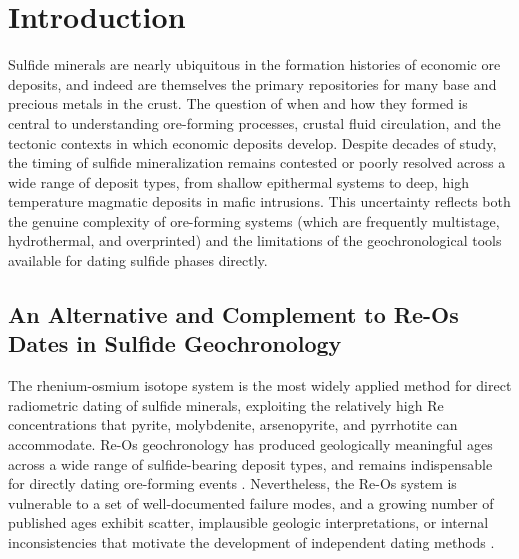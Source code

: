 %

\section{Introduction}\label{sec:ch3-introduction}

Sulfide minerals are nearly ubiquitous in the formation histories of economic ore deposits, 
and indeed are themselves the primary repositories for many base and precious
metals in the crust. The question of when and how they formed is
central to understanding ore-forming processes, crustal fluid
circulation, and the tectonic contexts in which economic deposits
develop. Despite decades of study, the timing of sulfide mineralization
remains contested or poorly resolved across a wide range of deposit
types, from shallow epithermal systems to deep, high temperature
magmatic deposits in mafic intrusions. This uncertainty reflects both
the genuine complexity of ore-forming systems (which are frequently
multistage, hydrothermal, and overprinted) and the limitations of the
geochronological tools available for dating sulfide phases directly.

\subsection{An Alternative and Complement to Re-Os Dates in Sulfide
Geochronology}

The rhenium-osmium isotope system is the most widely applied method for
direct radiometric dating of sulfide minerals, exploiting the relatively
high Re concentrations that pyrite, molybdenite, arsenopyrite, and
pyrrhotite can accommodate. Re-Os geochronology has produced
geologically meaningful ages across a wide range of sulfide-bearing
deposit types, and remains indispensable for directly dating ore-forming
events \citep{chen2015,hnatyshin2026,schoenberg1999,ostendorf2019,selby2002}. Nevertheless, the
Re-Os system is vulnerable to a set of well-documented failure modes,
and a growing number of published ages exhibit scatter, implausible
geologic interpretations, or internal inconsistencies that motivate the
development of independent dating methods \citep{stein2003,suzuki2001,li2025,lyu2020}.

